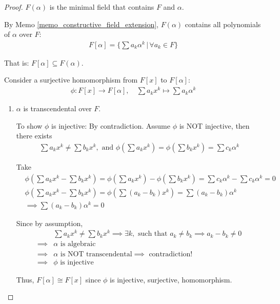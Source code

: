\documentclass[utf8]{ctexbook}
\theoremstyle{definition}
\begin{document}
\begin{proof}

$F(\alpha)$ is the minimal field that contains $F$ and $\alpha$.

By Memo \ref{memo_constructive_field_extension}, $F(\alpha)$ contains all polynomials of $\alpha$ over $F$:
\begin{align*}
F[\alpha] = \{ \sum a_k \alpha^k \, | \, \forall a_k \in F \}
\end{align*}

That is: $F[\alpha] \subseteq F(\alpha)$.

Consider a surjective homomorphism from $F[x]$ to $F[\alpha]$:
\begin{align*}
\phi: F[x] \longrightarrow F[\alpha], \quad  \sum a_k x^k \mapsto \sum a_k \alpha^k
\end{align*}

\begin{enumerate}
\item{$\alpha$ is transcendental over $F$.

To show $\phi$ is injective: By contradiction. Assume $\phi$ is NOT injective, then there exists 
\begin{align*}
\sum a_k x^k \neq \sum b_k x^k , \mbox{ and } \phi(\sum a_k x^k ) = \phi( \sum b_k x^k ) = \sum c_k \alpha^k
\end{align*}

Take
\begin{align*}
& \phi( \sum a_k x^k  - \sum b_k x^k ) = \phi ( \sum a_k x^k )  - \phi ( \sum b_k x^k) = \sum c_k \alpha^k - \sum c_k \alpha^k = 0 \\
&\phi( \sum a_k x^k  - \sum b_k x^k ) = \phi( \sum (a_k - b_k) x^k ) = \sum (a_k - b_k ) \alpha^k \\
& \implies \sum (a_k - b_k) \alpha^k = 0 
\end{align*}

Since by assumption,
\begin{align*}
& \sum a_k x^k \neq \sum b_k x^k  \implies \exists k, \mbox{ such that } a_k \neq b_k \implies a_k - b_k \neq 0 \\
\implies & \alpha \mbox{ is algebraic} \\
\implies & \alpha \mbox{ is NOT transcendental} \implies \mbox{ contradiction!} \\
\implies & \phi \mbox{ is injective}
\end{align*} 

Thus, $F[\alpha] \cong F[x]$ since $\phi$ is injective, surjective, homomorphism.

}
\end{enumerate}
\end{proof}
\end{document}
